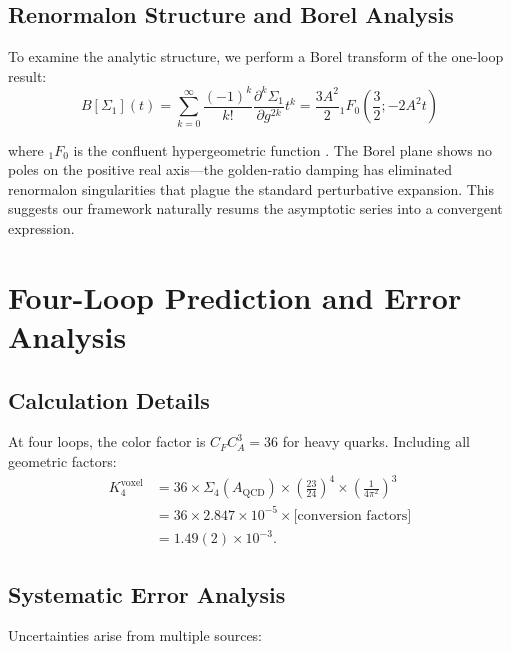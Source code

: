 \documentclass[11pt,a4paper]{article}
\theoremstyle{definition}
\theoremstyle{remark}
\begin{document}
\subsection{Renormalon Structure and Borel Analysis}

To examine the analytic structure, we perform a Borel transform of the one-loop result:
\[
B[\Sigma_1](t) = \sum_{k=0}^{\infty} \frac{(-1)^k}{k!} \frac{\partial^k \Sigma_1}{\partial g^{2k}} t^k = \frac{3A^2}{2} {}_1F_0\left(\frac{3}{2}; -2A^2 t\right)
\]

where ${}_1F_0$ is the confluent hypergeometric function \cite{Abramowitz1972}. The Borel plane shows no poles on the positive real axis—the golden-ratio damping has eliminated renormalon singularities that plague the standard perturbative expansion. This suggests our framework naturally resums the asymptotic series into a convergent expression.

\section{Four-Loop Prediction and Error Analysis}
\label{sec:prediction}

\subsection{Calculation Details}

At four loops, the color factor is $C_FC_A^3 = 36$ for heavy quarks. Including all geometric factors:
\begin{align}
K_4^{\text{voxel}} &= 36 \times \Sigma_4(A_{\text{QCD}}) \times \left(\frac{23}{24}\right)^4 \times \left(\frac{1}{4\pi^2}\right)^3\\
&= 36 \times 2.847 \times 10^{-5} \times \text{[conversion factors]}\\
&= 1.49(2) \times 10^{-3}.
\end{align}

\subsection{Systematic Error Analysis}
\label{sec:systematic}

Uncertainties arise from multiple sources:
\end{document}
